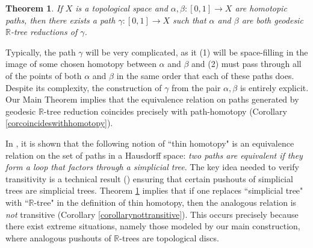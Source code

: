 \documentclass[12pt, leqno]{amsart}
\newcommand{\ui}{[0,1]}
\newcommand{\bbr}{\mathbb{R}}
\newtheorem{theorem}{Theorem}[section]
\theoremstyle{definition}\newtheorem{definition}[theorem]{Definition}
\begin{document}
\begin{theorem}\label{theoremmain}
If $X$ is a topological space and $\alpha,\beta:\ui\to X$ are homotopic paths, then there exists a path $\gamma:\ui\to X$ such that $\alpha$ and $\beta$ are both geodesic $\bbr$-tree reductions of $\gamma$.
\end{theorem}

Typically, the path $\gamma$ will be very complicated, as it (1) will be space-filling in the image of some chosen homotopy between $\alpha$ and $\beta$ and (2) must pass through all of the points of both $\alpha$ and $\beta$ in the same order that each of these paths does. Despite its complexity, the construction of $\gamma$ from the pair $\alpha,\beta$ is entirely explicit. Our Main Theorem implies that the equivalence relation on paths generated by geodesic $\bbr$-tree reduction coincides precisely with path-homotopy (Corollary \ref{corcoincideswithhomotopy}).

In \cite[Corollary 2.4]{HKK}, it is shown that the following notion of ``thin homotopy" is an equivalence relation on the set of paths in a Hausdorff space: \textit{two paths are equivalent if they form a loop that factors through a simplicial tree}. The key idea needed to verify transitivity is a technical result (\cite[Proposition 5.5]{HKK}) ensuring that certain pushouts of simplicial trees are simplicial trees. Theorem \ref{theoremmain} implies that if one replaces ``simplicial tree" with ``$\bbr$-tree" in the definition of thin homotopy, then the analogous relation is \textit{not} transitive (Corollary \ref{corollarynottransitive}). This occurs precisely because there exist extreme situations, namely those modeled by our main construction, where analogous pushouts of $\bbr$-trees are topological discs.
\end{document}
